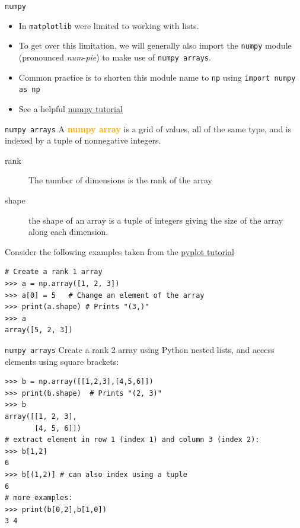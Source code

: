 \documentclass[xcolor=svgnames, handout]{beamer}
\newcommand{\nl}{\\[1em]}
\newcommand{\define}[1]{\textbf{\textcolor{orange}{#1}}}
\begin{document}
\begin{frame}[fragile]{\tt numpy}
\begin{itemize}
\item In {\tt matplotlib} were limited to working with lists.\nl
\item To get over this limitation, we will generally also import the {\tt numpy} module (pronounced \textit{num}-\textit{pie}) to make use of {\tt numpy arrays}.\nl


\item Common practice is to shorten this module name to {\tt np} using \verb|import numpy as np|\nl

\item See a helpful \href{http://cs231n.github.io/python-numpy-tutorial/}{numpy tutorial}
\end{itemize}

\end{frame}

\begin{frame}[fragile]{\tt numpy arrays}
 A \define{numpy array} is a grid of values, all of the same type, and is indexed by a tuple of nonnegative integers. 
\begin{description}
\item[rank] The number of dimensions is the rank of the array
\item[shape] the shape of an array is a tuple of integers giving the size of the array along each dimension.
\end{description}
Consider the following examples taken from  the \href{https://matplotlib.org/3.1.0/tutorials/introductory/pyplot.html}{pyplot tutorial}
\begin{Verbatim}[frame=single]
# Create a rank 1 array
>>> a = np.array([1, 2, 3])   
>>> a[0] = 5   # Change an element of the array
>>> print(a.shape) # Prints "(3,)"
>>> a
array([5, 2, 3])
\end{Verbatim}
\end{frame}


\begin{frame}[fragile]{\tt numpy arrays}
Create a rank 2 array using Python nested lists, and access elements using square brackets:
\begin{Verbatim}[frame=single]
>>> b = np.array([[1,2,3],[4,5,6]])    
>>> print(b.shape)  # Prints "(2, 3)"
>>> b
array([[1, 2, 3],
       [4, 5, 6]])
# extract element in row 1 (index 1) and column 3 (index 2):
>>> b[1,2]
6
>>> b[(1,2)] # can also index using a tuple
6
# more examples:
>>> print(b[0,2],b[1,0])
3 4
\end{Verbatim}
\end{frame}
\end{document}
